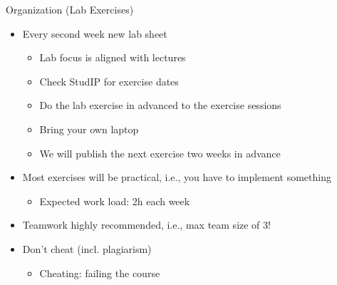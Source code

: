 \documentclass[aspectratio=169,handout]{../latex_main/tntbeamer}  %
\begin{document}
\begin{frame}[c]{Organization (Lab Exercises)}

\vspace{-1em}
\begin{itemize}
  \item Every \alert{second} week new lab sheet
  \begin{itemize}
      \item Lab focus is aligned with lectures
      \item Check StudIP for exercise dates
      \item Do the lab exercise in advanced to the exercise sessions
      \item Bring your own laptop
      \item We will publish the next exercise two weeks in advance
  \end{itemize}
  \item Most exercises will be practical, i.e., you have to implement something
  \begin{itemize}
    \item Expected work load: 2h each week
  \end{itemize}
  \item Teamwork highly recommended, i.e., max team size of 3!
  \pause
  \pause
  \item Don't cheat (incl. plagiarism)
  \begin{itemize}
    \item Cheating: failing the course
  \end{itemize}
\end{itemize}

\end{frame}
\end{document}
